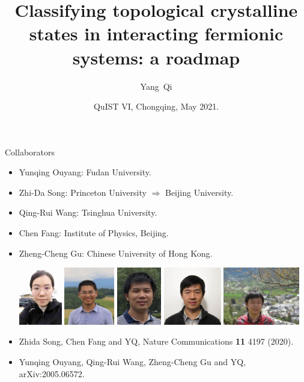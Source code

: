 \documentclass[xcolor=table, 11pt, aspectratio=1610]{beamer}
\title[Space-group SPTs] %
{Classifying topological crystalline states in interacting fermionic systems: a roadmap}
\author[Y Qi] %
{Yang~Qi}
\institute[Fudan] %
{Department of Physics, Fudan University}
\date{QuIST VI, Chongqing, May 2021.}
\begin{document}
\begin{frame}
  \titlepage
\end{frame}

\begin{frame}{Collaborators}
  \begin{itemize}
  \item Yunqing Ouyang: Fudan University.
  \item Zhi-Da Song: Princeton University $\Rightarrow$ Beijing University.
  \item Qing-Rui Wang: Tsinghua University.
  \item Chen Fang: Institute of Physics, Beijing.
  \item Zheng-Cheng Gu: Chinese University of Hong Kong.
    \begin{center}
      \includegraphics[height=2.5cm]{../people/yunqing}
      \includegraphics[height=2.5cm]{../people/zhidasong}
      \includegraphics[height=2.5cm]{../people/qingrui}      
      \includegraphics[height=2.5cm]{../people/chenfang}
      \includegraphics[height=2.5cm]{../people/zhengcheng}
    \end{center}
  \item Zhida Song, Chen Fang and YQ, Nature Communications \textbf{11} 4197 (2020).
  \item Yunqing Ouyang, Qing-Rui Wang, Zheng-Cheng Gu and YQ, arXiv:2005.06572.
\end{itemize}
\end{frame}
\end{document}
